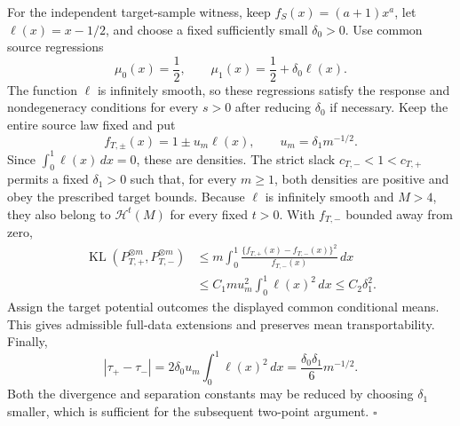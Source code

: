 For the independent target-sample witness, keep \(f_S(x)=(a+1)x^a\), let \(\ell(x)=x-1/2\), and choose a fixed sufficiently small \(\delta_0>0\). Use common source regressions
\[
\mu_0(x)=\frac12,
\qquad
\mu_1(x)=\frac12+\delta_0\ell(x).
\]
The function \(\ell\) is infinitely smooth, so these regressions satisfy the response and nondegeneracy conditions for every \(s>0\) after reducing \(\delta_0\) if necessary. Keep the entire source law fixed and put
\[
f_{T,\pm}(x)=1\pm u_m\ell(x),
\qquad
u_m=\delta_1m^{-1/2}.
\]
Since \(\int_0^1\ell(x)\,dx=0\), these are densities. The strict slack \(c_{T,-}<1<c_{T,+}\) permits a fixed \(\delta_1>0\) such that, for every \(m\ge1\), both densities are positive and obey the prescribed target bounds. Because \(\ell\) is infinitely smooth and \(M>4\), they also belong to \(\mathcal H^t(M)\) for every fixed \(t>0\). With \(f_{T,-}\) bounded away from zero,
\[
\begin{aligned}
\operatorname{KL}(P_{T,+}^{\otimes m},P_{T,-}^{\otimes m})
&\le m\int_0^1
\frac{\{f_{T,+}(x)-f_{T,-}(x)\}^2}{f_{T,-}(x)}\,dx\\
&\le C_1m u_m^2\int_0^1\ell(x)^2\,dx
\le C_2\delta_1^2.
\end{aligned}
\]
Assign the target potential outcomes the displayed common conditional means. This gives admissible full-data extensions and preserves mean transportability. Finally,
\[
\left|\tau_+-\tau_-\right|
=2\delta_0u_m\int_0^1\ell(x)^2\,dx
=\frac{\delta_0\delta_1}{6}m^{-1/2}.
\]
Both the divergence and separation constants may be reduced by choosing \(\delta_1\) smaller, which is sufficient for the subsequent two-point argument. \(\square\)
